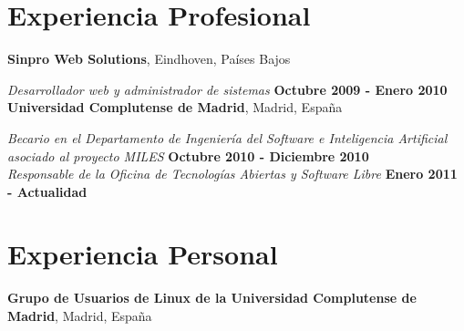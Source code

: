 \documentclass[margin,line]{resume}
\begin{document}
\begin{resume}
%
%
%
\section{\sc Experiencia Profesional}
{\bf Sinpro Web Solutions}, Eindhoven, Países Bajos

\vspace{-.3cm}
{\em Desarrollador web y administrador de sistemas} \hfill {\bf Octubre 2009 -
Enero 2010}\\

{\bf Universidad Complutense de Madrid}, Madrid, España

\vspace{-.3cm}
{\em Becario en el Departamento de Ingeniería del Software e Inteligencia Artificial asociado al proyecto MILES} \hfill {\bf Octubre 2010 -
Diciembre 2010}\\


\vspace{-.3cm}
{\em Responsable de la Oficina de Tecnologías Abiertas y Software Libre} \hfill {\bf Enero 2011 - Actualidad
}\\


%
\section{\sc Experiencia Personal}
{\bf Grupo de Usuarios de Linux de la Universidad Complutense de
Madrid}, Madrid, España


\end{resume}
\end{document}
